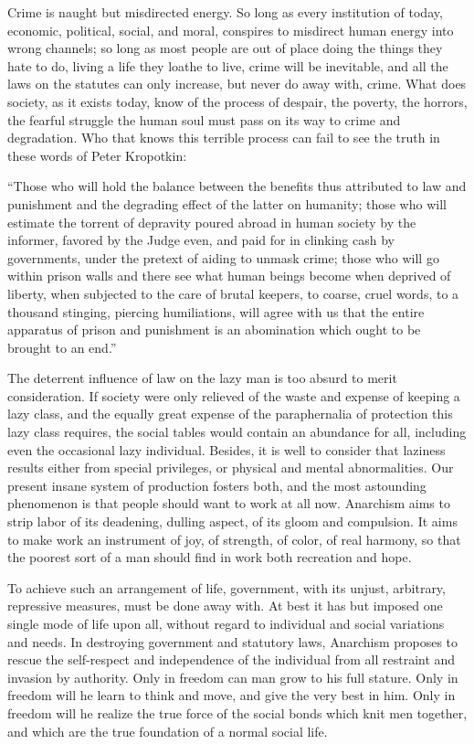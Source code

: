 Crime is naught but misdirected energy. So long as every institution
of today, economic, political, social, and moral, conspires to
misdirect human energy into wrong channels; so long as most people
 are out of place doing the things they hate to do, living a
life they loathe to live, crime will be inevitable, and all the laws
on the statutes can only increase, but never do away with, crime. What
does society, as it exists today, know of the process of despair, the
poverty, the horrors, the fearful struggle the human soul must pass on
its way to crime and degradation. Who that knows this terrible process
can fail to see the truth in these words of Peter Kropotkin:

``Those who will hold the balance between the benefits thus attributed
to law and punishment and the degrading effect of the latter on
humanity; those who will estimate the torrent of depravity poured
abroad in human society by the informer, favored by the Judge even,
and paid for in clinking cash by governments, under the pretext of
aiding to unmask crime; those who will go within prison walls and
there see what human beings become when deprived of liberty, when
subjected to the care of brutal keepers, to coarse, cruel words, to a
thousand stinging, piercing humiliations, will agree with us that the
entire apparatus of prison and punishment is an abomination which
ought to be brought to an end.''

The deterrent influence of law on the lazy man is too absurd to merit
consideration. If society were only relieved of the waste and expense
of keeping a lazy class, and the equally great expense of the
paraphernalia of protection this lazy class requires, the social
tables would contain an abundance for all, including even the
occasional lazy  individual. Besides, it is well to consider
that laziness results either from special privileges, or physical and
mental abnormalities. Our present insane system of production fosters
both, and the most astounding phenomenon is that people should want to
work at all now. Anarchism aims to strip labor of its deadening,
dulling aspect, of its gloom and compulsion. It aims to make work an
instrument of joy, of strength, of color, of real harmony, so that the
poorest sort of a man should find in work both recreation and hope.

To achieve such an arrangement of life, government, with its unjust,
arbitrary, repressive measures, must be done away with. At best it has
but imposed one single mode of life upon all, without regard to
individual and social variations and needs. In destroying government
and statutory laws, Anarchism proposes to rescue the self-respect and
independence of the individual from all restraint and invasion by
authority. Only in freedom can man grow to his full stature. Only in
freedom will he learn to think and move, and give the very best in
him. Only in freedom will he realize the true force of the social
bonds which knit men together, and which are the true foundation of a
normal social life.

